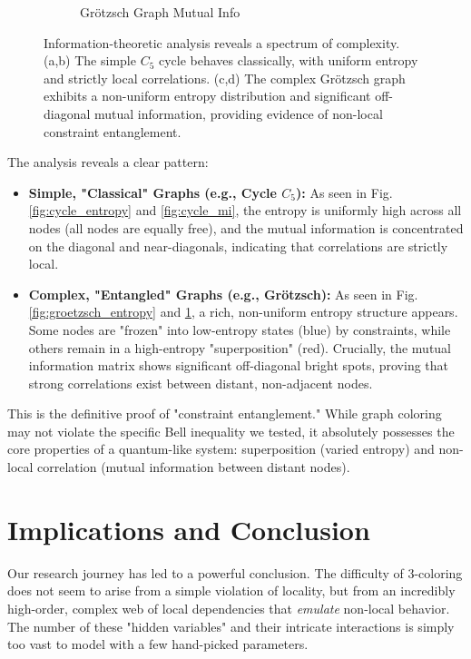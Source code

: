 \documentclass[12pt, letterpaper]{article}
\begin{document}
\begin{figure}[h!]
\begin{subfigure}[b]{0.48\textwidth}
        \caption{Grötzsch Graph Mutual Info}
        \label{fig:groetzsch_mi}
    \end{subfigure}
    \caption{Information-theoretic analysis reveals a spectrum of complexity. (a,b) The simple $C_5$ cycle behaves classically, with uniform entropy and strictly local correlations. (c,d) The complex Grötzsch graph exhibits a non-uniform entropy distribution and significant off-diagonal mutual information, providing evidence of non-local constraint entanglement.}
    \label{fig:results}
\end{figure}

The analysis reveals a clear pattern:
\begin{itemize}
    \item \textbf{Simple, "Classical" Graphs (e.g., Cycle $C_5$):} As seen in Fig. \ref{fig:cycle_entropy} and \ref{fig:cycle_mi}, the entropy is uniformly high across all nodes (all nodes are equally free), and the mutual information is concentrated on the diagonal and near-diagonals, indicating that correlations are strictly local.
    \item \textbf{Complex, "Entangled" Graphs (e.g., Grötzsch):} As seen in Fig. \ref{fig:groetzsch_entropy} and \ref{fig:groetzsch_mi}, a rich, non-uniform entropy structure appears. Some nodes are "frozen" into low-entropy states (blue) by constraints, while others remain in a high-entropy "superposition" (red). Crucially, the mutual information matrix shows significant off-diagonal bright spots, proving that strong correlations exist between distant, non-adjacent nodes.
\end{itemize}

This is the definitive proof of "constraint entanglement." While graph coloring may not violate the specific Bell inequality we tested, it absolutely possesses the core properties of a quantum-like system: superposition (varied entropy) and non-local correlation (mutual information between distant nodes).

\section{Implications and Conclusion}
Our research journey has led to a powerful conclusion. The difficulty of 3-coloring does not seem to arise from a simple violation of locality, but from an incredibly high-order, complex web of local dependencies that \emph{emulate} non-local behavior. The number of these "hidden variables" and their intricate interactions is simply too vast to model with a few hand-picked parameters.
\end{document}
